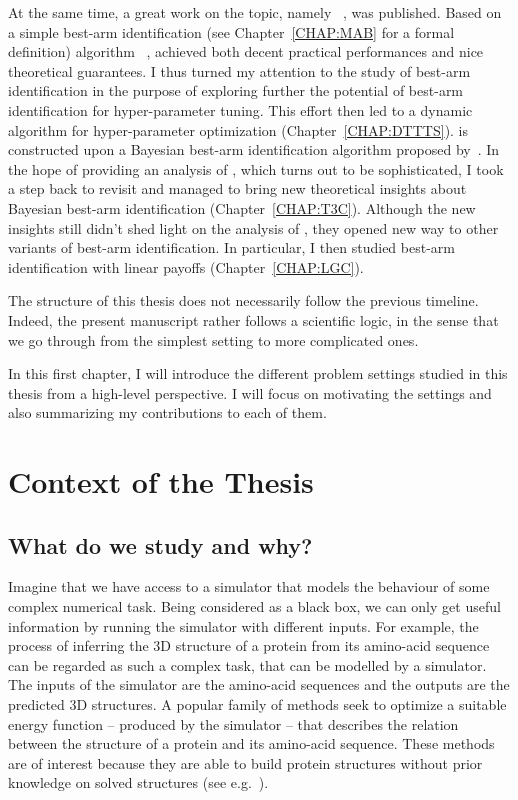 At the same time, a great work on the topic, namely \Hyperband{}~\citep{li2017hyperband}, was published. Based on a simple best-arm identification (see Chapter~\ref{CHAP:MAB} for a formal definition) algorithm \SHA{}~\citep{bubeck2009pure}, \Hyperband{} achieved both decent practical performances and nice theoretical guarantees. I thus turned my attention to the study of best-arm identification in the purpose of exploring further the potential of best-arm identification for hyper-parameter tuning. This effort then led to a dynamic algorithm \DTTTS{} for hyper-parameter optimization (Chapter~\ref{CHAP:DTTTS}). \DTTTS{} is constructed upon a Bayesian best-arm identification algorithm \TTTS{} proposed by~\cite{russo2016ttts}. In the hope of providing an analysis of \DTTTS{}, which turns out to be sophisticated, I took a step back to revisit \TTTS{} and managed to bring new theoretical insights about Bayesian best-arm identification (Chapter~\ref{CHAP:T3C}). Although the new insights still didn't shed light on the analysis of \DTTTS{}, they opened new way to other variants of best-arm identification. In particular, I then studied best-arm identification with linear payoffs (Chapter~\ref{CHAP:LGC}).

The structure of this thesis does not necessarily follow the previous timeline. Indeed, the present manuscript rather follows a scientific logic, in the sense that we go through from the simplest setting to more complicated ones. 

In this first chapter, I will introduce the different problem settings studied in this thesis from a high-level perspective. I will focus on motivating the settings and also summarizing my contributions to each of them.

\section{Context of the Thesis}\label{sec:intro.context}
	
\subsection{What do we study and why?}\label{sec:intro.context.what}

Imagine that we have access to a simulator that models the behaviour of some complex numerical task. Being considered as a black box, we can only get useful information by running the simulator with different inputs. For example, the process of inferring the 3D structure of a protein from its amino-acid sequence can be regarded as such a complex task, that can be modelled by a simulator. The inputs of the simulator are the amino-acid sequences and the outputs are the predicted 3D structures. A popular family of methods seek to optimize a suitable energy function -- produced by the simulator -- that describes the relation between the structure of a protein and its amino-acid sequence. These methods are of interest because they are able to build protein structures without prior knowledge on solved structures (see e.g.~\citealt{zhang2008}).

